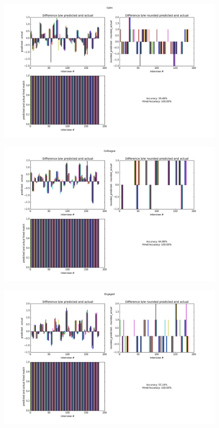 \documentclass[11pt]{article}
\begin{document}
\begin{figure}[H]
\begin{center}
\includegraphics[width=1\columnwidth]{figures2/Calm.png}
\end{center}
\end{figure}

\begin{figure}[H]
\begin{center}
\includegraphics[width=1\columnwidth]{figures2/Colleague.png}
\end{center}
\end{figure}

\begin{figure}[H]
\begin{center}
\includegraphics[width=1\columnwidth]{figures2/Engaged.png}
\end{center}
\end{figure}
\end{document}
